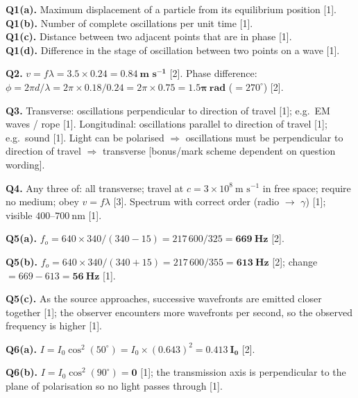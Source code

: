 \begin{markscheme}

\textbf{Q1(a).} Maximum displacement of a particle from its equilibrium position [1].\\
\textbf{Q1(b).} Number of complete oscillations per unit time [1].\\
\textbf{Q1(c).} Distance between two adjacent points that are in phase [1].\\
\textbf{Q1(d).} Difference in the stage of oscillation between two points on a wave [1].

\vspace{0.5em}\textbf{Q2.} $v = f\lambda = 3.5 \times 0.24 = \mathbf{0.84\ \text{m s}^{-1}}$ [2]. Phase difference: $\phi = 2\pi d/\lambda = 2\pi \times 0.18/0.24 = 2\pi \times 0.75 = \mathbf{1.5\pi\ \text{rad}}$ ($= 270^\circ$) [2].

\vspace{0.5em}\textbf{Q3.} Transverse: oscillations perpendicular to direction of travel [1]; e.g.\ EM waves / rope [1]. Longitudinal: oscillations parallel to direction of travel [1]; e.g.\ sound [1]. Light can be polarised $\Rightarrow$ oscillations must be perpendicular to direction of travel $\Rightarrow$ transverse [bonus/mark scheme dependent on question wording].

\vspace{0.5em}\textbf{Q4.} Any three of: all transverse; travel at $c = 3\times10^8\ \text{m s}^{-1}$ in free space; require no medium; obey $v = f\lambda$ [3]. Spectrum with correct order (radio $\to$ $\gamma$) [1]; visible $400$--$700\ \text{nm}$ [1].

\vspace{0.5em}\textbf{Q5(a).} $f_o = 640\times340/(340-15) = 217\,600/325 = \mathbf{669\ \text{Hz}}$ [2].

\vspace{0.5em}\textbf{Q5(b).} $f_o = 640\times340/(340+15) = 217\,600/355 = \mathbf{613\ \text{Hz}}$ [2]; change $= 669 - 613 = \mathbf{56\ \text{Hz}}$ [1].

\vspace{0.5em}\textbf{Q5(c).} As the source approaches, successive wavefronts are emitted closer together [1]; the observer encounters more wavefronts per second, so the observed frequency is higher [1].

\vspace{0.5em}\textbf{Q6(a).} $I = I_0\cos^2(50^\circ) = I_0\times(0.643)^2 = \mathbf{0.413\ I_0}$ [2].

\vspace{0.5em}\textbf{Q6(b).} $I = I_0\cos^2(90^\circ) = \mathbf{0}$ [1]; the transmission axis is perpendicular to the plane of polarisation so no light passes through [1].


\end{markscheme}
